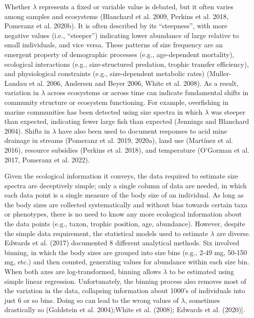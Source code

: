 \documentclass[
  12pt,
]{article}
\numberwithin{equation}
\begin{document}
Whether \(\lambda\) represents a fixed or variable value is debated, but
it often varies among samples and ecosystems (Blanchard et al. 2009,
Perkins et al. 2018, Pomeranz et al. 2020b). It is often described by
its ``steepness'', with more negative values (i.e., ``steeper'')
indicating lower abundance of large relative to small individuals, and
vice versa. These patterns of size frequency are an emergent property of
demographic processes (e.g., age-dependent mortality), ecological
interactions (e.g., size-structured predation, trophic transfer
efficiency), and physiological constraints (e.g., size-dependent
metabolic rates) (Muller-Landau et al. 2006, Andersen and Beyer 2006,
White et al. 2008). As a result, variation in \(\lambda\) across
ecosystems or across time can indicate fundamental shifts in community
structure or ecosystem functioning. For example, overfishing in marine
communities has been detected using size spectra in which \(\lambda\)
was steeper than expected, indicating fewer large fish than expected
(Jennings and Blanchard 2004). Shifts in \(\lambda\) have also been used
to document responses to acid mine drainage in streams (Pomeranz et al.
2019, 2020a), land use (Martínez et al. 2016), resource subsidies
(Perkins et al. 2018), and temperature (O'Gorman et al. 2017, Pomeranz
et al. 2022).

Given the ecological information it conveys, the data required to
estimate size spectra are deceptively simple; only a single column of
data are needed, in which each data point is a single measure of the
body size of an individual. As long as the body sizes are collected
systematically and without bias towards certain taxa or phenotypes,
there is no need to know any more ecological information about the data
points (e.g., taxon, trophic position, age, abundance). However, despite
the simple data requirement, the statistical models used to estimate
\(\lambda\) are diverse. Edwards et al. (2017) documented 8 different
analytical methods. Six involved binning, in which the body sizes are
grouped into size bins (e.g., 2-49 mg, 50-150 mg, etc.) and then
counted, generating values for abundance within each size bin. When both
axes are log-transformed, binning allows \(\lambda\) to be estimated
using simple linear regression. Unfortunately, the binning process also
removes most of the variation in the data, collapsing information about
1000's of individuals into just 6 or so bins. Doing so can lead to the
wrong values of \(\lambda\), sometimes drastically so (Goldstein et al.
2004);White et al. (2008); Edwards et al. (2020){]}.
\end{document}
